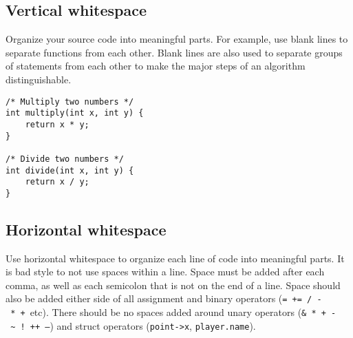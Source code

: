 \documentclass{article}
\newcommand{\propertilde}{\nolinkurl{~}}
\begin{document}
\subsection{Vertical whitespace}
Organize your source code into meaningful parts.
For example, use blank lines to separate functions from each other.
Blank lines are also used to separate groups of statements from each other to make the major steps of an algorithm distinguishable.

\begin{lstlisting}
/* Multiply two numbers */
int multiply(int x, int y) {
    return x * y;
}

/* Divide two numbers */
int divide(int x, int y) {
    return x / y;
}
\end{lstlisting}

\subsection{Horizontal whitespace}
Use horizontal whitespace to organize each line of code into meaningful parts.
It is bad style to not use spaces within a line.
Space must be added after each comma, as well as each semicolon that is not on the end of a line.
Space should also be added either side of all assignment and binary operators (\texttt{=~+=~/~-~*~+}~etc).
There should be no spaces added around unary operators (\texttt{\&~*~+~-~\propertilde~!~++~--}) and struct operators (\texttt{point->x}, \texttt{player.name}).
\end{document}
